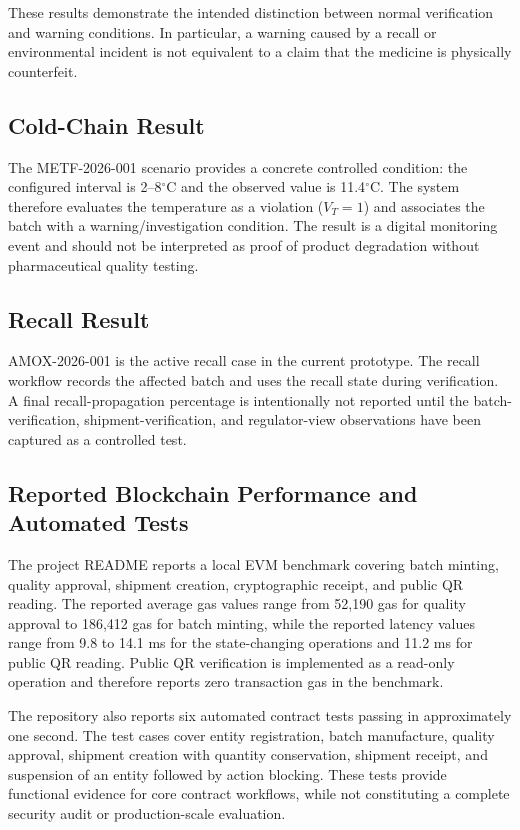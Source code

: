 \documentclass[11pt,a4paper]{article}
\begin{document}
These results demonstrate the intended distinction between normal verification and warning conditions. In particular, a warning caused by a recall or environmental incident is not equivalent to a claim that the medicine is physically counterfeit.

\subsection{Cold-Chain Result}
The METF-2026-001 scenario provides a concrete controlled condition: the configured interval is 2--8$^\circ$C and the observed value is 11.4$^\circ$C. The system therefore evaluates the temperature as a violation ($V_T = 1$) and associates the batch with a warning/investigation condition. The result is a digital monitoring event and should not be interpreted as proof of product degradation without pharmaceutical quality testing.

\subsection{Recall Result}
AMOX-2026-001 is the active recall case in the current prototype. The recall workflow records the affected batch and uses the recall state during verification. A final recall-propagation percentage is intentionally not reported until the batch-verification, shipment-verification, and regulator-view observations have been captured as a controlled test.

\subsection{Reported Blockchain Performance and Automated Tests}
The project README reports a local EVM benchmark covering batch minting, quality approval, shipment creation, cryptographic receipt, and public QR reading. The reported average gas values range from 52,190 gas for quality approval to 186,412 gas for batch minting, while the reported latency values range from 9.8 to 14.1 ms for the state-changing operations and 11.2 ms for public QR reading. Public QR verification is implemented as a read-only operation and therefore reports zero transaction gas in the benchmark.

The repository also reports six automated contract tests passing in approximately one second. The test cases cover entity registration, batch manufacture, quality approval, shipment creation with quantity conservation, shipment receipt, and suspension of an entity followed by action blocking. These tests provide functional evidence for core contract workflows, while not constituting a complete security audit or production-scale evaluation.
\end{document}
